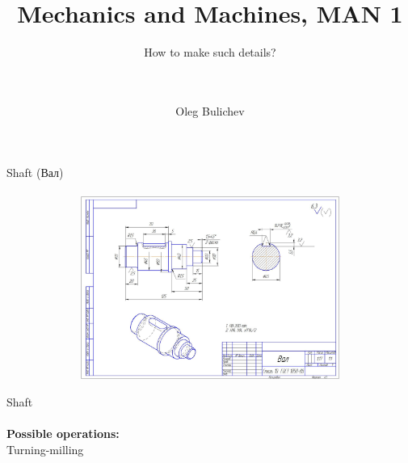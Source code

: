 \documentclass[aspectratio=169]{beamer}
\title[MaM]{Mechanics and Machines, MAN 1} %
\subtitle{How to make such details?
\\ \  \\ \ 
    } %
\author{Oleg Bulichev}
\newcommand{\fbckg}[1]{\usebackgroundtemplate{\texttt{[image: \#1]}}}%
\begin{document}
\setlength{\abovedisplayskip}{0pt}
\setlength{\belowdisplayskip}{0pt}
\setlength{\abovedisplayshortskip}{0pt}
\setlength{\belowdisplayshortskip}{0pt}

\fbckg{fibeamer/figs/title_page.png}

\fbckg{fibeamer/figs/common.png}

\note{\scriptsize
\ 
}

\begin{frame}[c]{Shaft (Вал)}
\framesubtitle{}
    \vspace{-0.6cm}
    \begin{figure}[H]
        \centering\includegraphics[height=6cm,width=1\textwidth,keepaspectratio]{shaft.png}
        \label{fig:shaft.png}
    \end{figure}
\end{frame}

\begin{frame}[c]{Shaft}
\framesubtitle{}
    \LARGE \centering
    \textbf{Possible operations: } \\ 
    Turning-milling\\
\end{frame}
\end{document}
